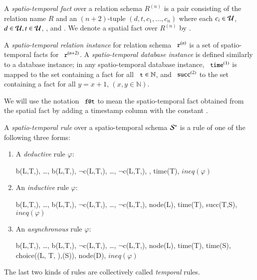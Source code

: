 A {\em spatio-temporal fact} over a relation schema $R^{(n)}$ is a pair consisting of the relation name $R$ and an $(n+2)$-tuple $(d,t,c_1,\ldots,c_n)$ where each $c_i \in \univ$, $d \in \univ, t \in \univ$, , and .  We denote a spatial fact over $R^{(n)}$ by .

A {\em spatio-temporal relation instance} for relation schema $\dedalus{r}^{(n)}$ is a set of spatio-temporal facts for
$\dedalus{r}^{(n+2)}$.  A {\em spatio-temporal database instance} is defined similarly to a database instance; in any spatio-temporal database instance, $\dedalus{time}^{(1)}$ is mapped to the set containing a  fact for all $\dedalus{t} \in \mathbb{N}$, and $\dedalus{succ}^{(2)}$ to the set containing a  fact for all $y = x + 1$, $(x,y \in \mathbb{N})$.

We will use the notation $\dedalus{f@t}$ to mean the spatio-temporal fact obtained from the spatial fact  by adding a timestamp column with the constant .

A {\em spatio-temporal rule} over a spatio-temporal schema $\stschema$ is a rule of one of the following three forms:

\begin{enumerate}
\item 
A {\em deductive} rule $\varphi$:

\begin{Drules}
        {b(L,T,), \ldots, b(L,T,), $\lnot$c(L,T,), \ldots, $\lnot$c(L,T,), , time(T), \(ineq(\varphi)\)}
\end{Drules}
\item 
An {\em inductive} rule $\varphi$:

\begin{Drules}
        {b(L,T,), \ldots, b(L,T,), $\lnot$c(L,T,), \ldots, $\lnot$c(L,T,), node(L), time(T), succ(T,S), \(ineq(\varphi)\)}
\end{Drules}
\item 
An {\em asynchronous} rule $\varphi$:

\begin{Drules}
        {b(L,T,), \ldots, b(L,T,),
          $\lnot$c(L,T,), \ldots, $\lnot$c(L,T,),
          node(L), time(T), time(S), choice((L, T, ),(S)), node(D), \(ineq(\varphi)\)}
\end{Drules}
\end{enumerate}
The last two kinds of rules are collectively called {\em temporal} rules.

